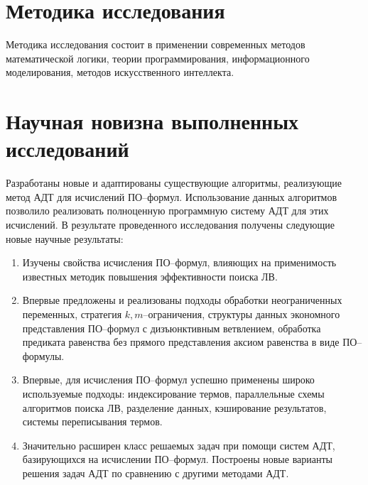 \section*{Методика исследования}
Методика исследования состоит в применении современных методов математической логики, теории программирования, информационного моделирования, методов искусственного интеллекта.


\section*{Научная новизна выполненных исследований}
Разработаны новые и адаптированы существующие алгоритмы, реализующие метод АДТ для исчислений ПО--формул. Использование данных алгоритмов позволило реализовать полноценную программную систему АДТ для этих исчислений. В результате проведенного исследования получены следующие новые научные результаты:
\begin{enumerate}
\item Изучены свойства исчисления ПО--формул, влияющих на применимость известных методик повышения эффективности поиска ЛВ.
\item Впервые предложены и реализованы подходы обработки неограниченных переменных, стратегия $k,m$--ограничения, структуры данных экономного представления ПО--формул с дизъюнктивным ветвлением, обработка предиката равенства без прямого представления аксиом равенства в виде ПО--формулы.
\item Впервые, для исчисления ПО--формул успешно применены широко используемые подходы: индексирование термов, параллельные схемы алгоритмов поиска ЛВ, разделение данных, кэширование результатов, системы переписывания термов.
\item Значительно расширен класс решаемых задач при помощи систем АДТ, базирующихся на исчислении ПО--формул. Построены новые варианты решения задач АДТ по сравнению с другими методами АДТ.
\end{enumerate}




